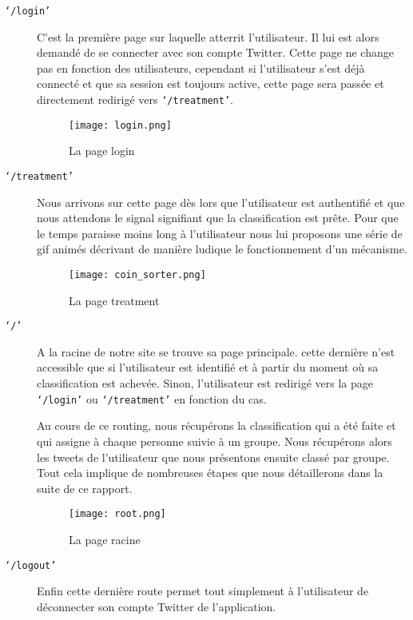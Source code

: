 \documentclass[a4paper]{article}
\begin{document}
\begin{description}
\item[\texttt{`/login'}] C'est la première page sur laquelle atterrit l'utilisateur. Il lui est alors demandé de se connecter avec son compte Twitter. Cette page ne change pas en fonction des utilisateurs, cependant si l'utilisateur s'est déjà connecté et que sa session est toujours active, cette page sera passée et directement redirigé vers \texttt{`/treatment'}.
\begin{figure}[ht]
\begin{center}
\texttt{[image: login.png]}
\caption{La page login}
\label{fig:login}
\end{center}
\end{figure}

\item[\texttt{`/treatment'}] Nous arrivons sur cette page dès lors que l'utilisateur est authentifié et que nous attendons le signal signifiant que la classification est prête. Pour que le temps paraisse moins long à l'utilisateur nous lui proposons une série de gif animés décrivant de manière ludique le fonctionnement d'un mécanisme.

\begin{figure}[ht]
\begin{center}
\texttt{[image: coin\_sorter.png]}
\caption{La page treatment}
\label{fig:treatment}
\end{center}
\end{figure}



\item[\texttt{`/'}] A la racine de notre site se trouve sa page principale. cette dernière n'est accessible que si l'utilisateur est identifié et à partir du moment où sa classification est achevée. Sinon, l'utilisateur est redirigé vers la page \texttt{`/login'} ou \texttt{`/treatment'} en fonction du cas.

Au cours de ce routing, nous récupérons la classification qui a été faite et qui assigne à chaque personne suivie à un groupe. Nous récupérons alors les tweets de l'utilisateur que nous présentons ensuite classé par groupe. Tout cela implique de nombreuses étapes que nous détaillerons dans la suite de ce rapport.

\begin{figure}[ht]
\begin{center}
\texttt{[image: root.png]}
\caption{La page racine}
\label{fig:racine}
\end{center}
\end{figure}

\item[\texttt{`/logout'}] Enfin cette dernière route permet tout simplement à l'utilisateur de déconnecter son compte Twitter de l'application.
\end{description}
\end{document}
